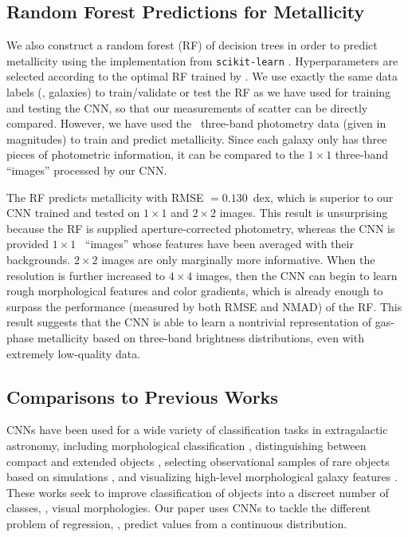 \documentclass[fleqn,usenatbib]{mnras}
\begin{document}
\subsection{Random Forest Predictions for Metallicity}
We also construct a random forest (RF) of decision trees in order to predict metallicity using the implementation from \texttt{scikit-learn} \citep{Pedregosa2012}. Hyperparameters are selected according to the optimal RF trained by \cite{Acquaviva2016}. We use exactly the same data labels (\ie, galaxies) to train/validate or test the RF as we have used for training and testing the CNN, so that our measurements of scatter can be directly compared. However, we have used the \sdssg\sdssr\sdssi\ three-band photometry data (given in magnitudes) to train and predict metallicity. Since each galaxy only has three pieces of photometric information, it can be compared to the $1 \times 1$ three-band ``images'' processed by our CNN.

The RF predicts metallicity with RMSE $= 0.130$~dex, which is superior to our CNN trained and tested on $1\times 1$ and $2 \times 2$ images.
This result is unsurprising because the RF is supplied aperture-corrected photometry, whereas the CNN is provided $1 \times 1 $ \sdssg\sdssr\sdssi\ ``images'' whose features have been averaged with their backgrounds. $2 \times 2$ images are only marginally more informative. When the resolution is further increased to $4 \times 4$ images, then the CNN can begin to learn rough morphological features and color gradients, which is already enough to surpass the performance (measured by both RMSE and NMAD) of the RF.
This result suggests that the CNN is able to learn a nontrivial representation of gas-phase metallicity based on three-band brightness distributions, even with extremely low-quality data.

\subsection{Comparisons to Previous Works}\label{sec:previous work}
CNNs have been used for a wide variety of classification tasks in extragalactic astronomy, including morphological classification , distinguishing between compact and extended objects \citep{Kim2017}, selecting observational samples of rare objects based on simulations \citep{Huertas-Company2018, Lanusse2017}, and visualizing high-level morphological galaxy features \citep{Dai2018}. These works seek to improve classification of objects into a discreet number of classes, \ie, visual morphologies. Our paper uses CNNs to tackle the different problem of regression, \ie, predict values from a continuous distribution.
\end{document}
